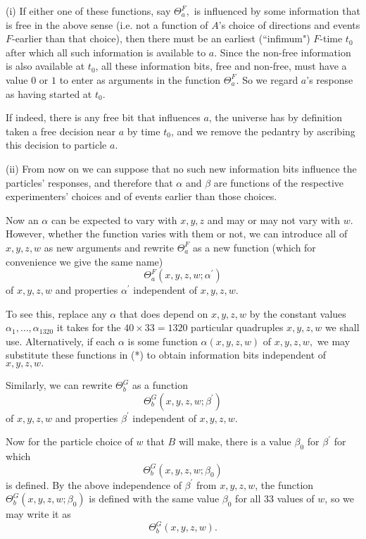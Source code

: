 \documentclass[12pt]{article}
\begin{document}
(i) If either one of these functions, say $\Theta_a^F,$ is influenced by some information that is free in the above sense (i.e. not a function of $A$'s choice of directions and events $F$-earlier than that choice), then there must be an earliest (``infimum") $F$-time $t_0$ after which all such information is available to $a$. Since the non-free information is also available at $t_0$, all these information bits, free and non-free, must have a value $0$ or $1$ to enter as arguments in the function $\Theta_a^F.$ So we regard $a$'s response as having started at $t_0$. 

If indeed, there is any free bit that influences $a$, the universe has by definition taken a free decision near $a$ by time $t_0$, and we remove the pedantry by ascribing this decision to particle $a$.

(ii) From now on we can suppose that no such new information bits influence the particles' responses, and therefore that $\alpha$ and $\beta$ are functions of the respective experimenters' choices and of events earlier than those choices. 

Now an $\alpha$ can be expected to vary with $x, y, z$ and may or may not vary with $w$. However, whether the function varies with them or not, we can introduce all of $x, y, z, w$ as new arguments and rewrite $\Theta_a^F$ as a new function (which for convenience we give the same name) 
\begin{equation}\tag{*}
\Theta_a^F(x, y, z, w; \alpha^\prime)
\end{equation}
of $x,y,z,w$ and properties $\alpha^\prime$ independent of $x,y,z,w.$

To see this, replace any $\alpha$ that does depend on $x,y,z,w$ by the constant values $\alpha_1, \ldots, \alpha_{1320}$ it takes for the $40\times 33 = 1320$ particular quadruples $x,y,z,w$ we shall use. Alternatively, if each $\alpha$ is some function $\alpha(x,y,z,w)$ of $x,y,z,w,$ we may substitute these functions in (*) to obtain information bits independent of $x,y,z,w.$

Similarly, we can rewrite $\Theta_b^G$ as a function \[\Theta_b^G(x,y,z,w; \beta^\prime)\] of $x,y,z,w$ and properties $\beta^\prime$ independent of $x,y,z,w$. 

Now for the particle choice of $w$ that $B$ will make, there is a value $\beta_0$ for $\beta^\prime$ for which \[\Theta_b^G(x,y,z,w; \beta_0)\] is defined. By the above independence of $\beta^\prime$ from $x,y,z,w$, the function $\Theta_b^G(x,y,z,w; \beta_0)$ is defined with the same value $\beta_0$ for all $33$ values of $w$, so we may write it as \[\Theta^G_b(x,y,z,w).\]
\end{document}

